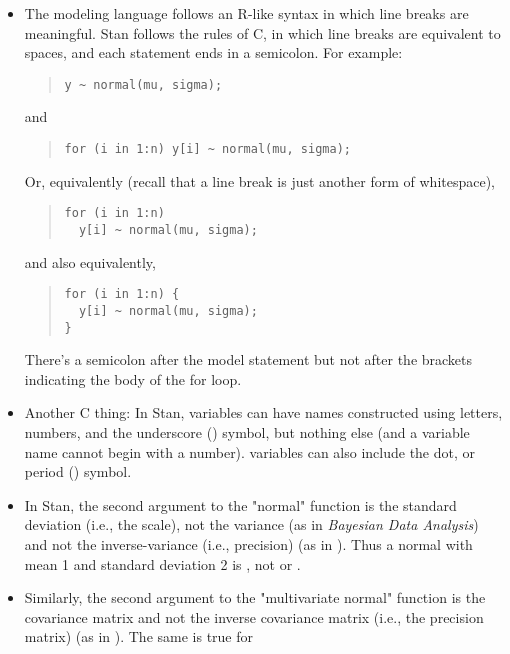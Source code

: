 \begin{itemize}
\item The \BUGS modeling language follows an R-like syntax in which
  line breaks are meaningful.  Stan follows the rules of C, in which
  line breaks are equivalent to spaces, and each statement ends in a
  semicolon.  For example:
%
\begin{quote}
\begin{Verbatim}[fontsize=\small]
y ~ normal(mu, sigma);
\end{Verbatim}
\end{quote}
%
and
%
\begin{quote}
\begin{Verbatim}[fontsize=\small]
for (i in 1:n) y[i] ~ normal(mu, sigma);
\end{Verbatim}
\end{quote}
%
Or, equivalently (recall that a line break is just another form of whitespace),
%
\begin{quote}
\begin{Verbatim}[fontsize=\small]
for (i in 1:n)
  y[i] ~ normal(mu, sigma);
\end{Verbatim}
\end{quote}
%
and also equivalently, 
%
\begin{quote}
\begin{Verbatim}[fontsize=\small]
for (i in 1:n) {
  y[i] ~ normal(mu, sigma);
}
\end{Verbatim}
\end{quote}
%
There's a semicolon after the model statement but not after the
brackets indicating the body of the for loop.
%
\item Another C thing: In Stan, variables can have names constructed
  using letters, numbers, and the underscore (\code{\_}) symbol, but
  nothing else (and a variable name cannot begin with a number).
  \BUGS variables can also include the dot, or period () symbol.
%
\item In Stan, the second argument to the "normal" function is the
  standard deviation (i.e., the scale), not the variance (as in {\it
    Bayesian Data Analysis}) and not the inverse-variance (i.e.,
  precision) (as in \BUGS).  Thus a normal with mean 1 and standard
  deviation 2 is , not  or
  .
%
\item Similarly, the second argument to the "multivariate normal" 
  function is the covariance matrix and not the inverse covariance matrix
  (i.e., the precision matrix) (as in \BUGS). The same is true for

\end{itemize}
